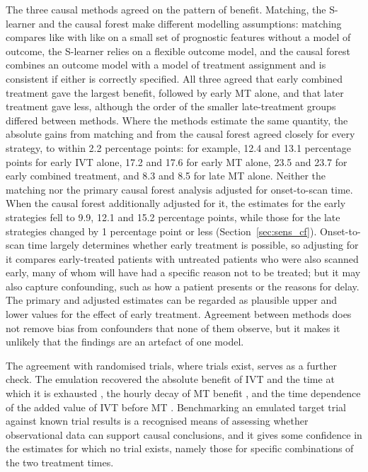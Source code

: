 The three causal methods agreed on the pattern of benefit. Matching, the S-learner and the causal forest make different modelling assumptions: matching compares like with like on a small set of prognostic features without a model of outcome, the S-learner relies on a flexible outcome model, and the causal forest combines an outcome model with a model of treatment assignment and is consistent if either is correctly specified. All three agreed that early combined treatment gave the largest benefit, followed by early MT alone, and that later treatment gave less, although the order of the smaller late-treatment groups differed between methods. Where the methods estimate the same quantity, the absolute gains from matching and from the causal forest agreed closely for every strategy, to within 2.2 percentage points: for example, 12.4 and 13.1 percentage points for early IVT alone, 17.2 and 17.6 for early MT alone, 23.5 and 23.7 for early combined treatment, and 8.3 and 8.5 for late MT alone. Neither the matching nor the primary causal forest analysis adjusted for onset-to-scan time. When the causal forest additionally adjusted for it, the estimates for the early strategies fell to 9.9, 12.1 and 15.2 percentage points, while those for the late strategies changed by 1 percentage point or less (Section~\ref{sec:sens_cf}). Onset-to-scan time largely determines whether early treatment is possible, so adjusting for it compares early-treated patients with untreated patients who were also scanned early, many of whom will have had a specific reason not to be treated; but it may also capture confounding, such as how a patient presents or the reasons for delay. The primary and adjusted estimates can be regarded as plausible upper and lower values for the effect of early treatment. Agreement between methods does not remove bias from confounders that none of them observe, but it makes it unlikely that the findings are an artefact of one model.

The agreement with randomised trials, where trials exist, serves as a further check. The emulation recovered the absolute benefit of IVT and the time at which it is exhausted , the hourly decay of MT benefit , and the time dependence of the added value of IVT before MT . Benchmarking an emulated target trial  against known trial results is a recognised means of assessing whether observational data can support causal conclusions, and it gives some confidence in the estimates for which no trial exists, namely those for specific combinations of the two treatment times.

